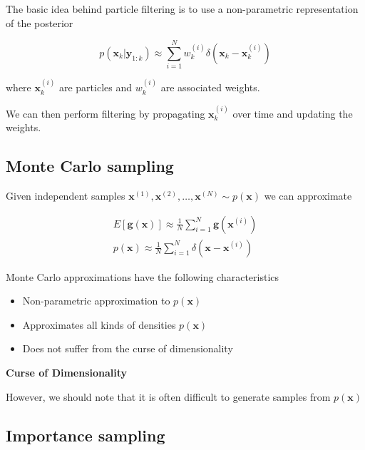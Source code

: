 The basic idea behind particle filtering is to use a non-parametric representation of the posterior

\begin{equation}
p(\mathbf{x}_k | \mathbf{y}_{1:k}) \approx \sum_{i=1}^N w_{k}^{(i)} \delta (\mathbf{x}_k -\mathbf{x}_{k}^{(i)})
\end{equation}

where $\mathbf{x}_{k}^{(i)}$ are particles and $w_{k}^{(i)}$ are associated weights.

We can then perform filtering by propagating $\mathbf{x}_{k}^{(i)}$ over time and
updating the weights.


\subsection{Monte Carlo sampling}
\label{monte_carlo_sampling}

Given independent samples $\mathbf{x}^{(1)}, \mathbf{x}^{(2)}, \ldots, \mathbf{x}^{(N)} \sim p(\mathbf{x})$ we can approximate

\begin{eqnarray}
E[\mathbf{g}(\mathbf{x})] \approx \frac{1}{N}\sum_{i=1}^N \mathbf{g}(\mathbf{x}^{(i)}) \\
p(\mathbf{x}) \approx \frac{1}{N}\sum_{i=1}^N \delta(\mathbf{x} - \mathbf{x}^{(i)})
\end{eqnarray}

Monte Carlo approximations have the following characteristics

\begin{itemize}
\item Non-parametric approximation to $p(\mathbf{x})$
\item Approximates all kinds of densities $p(\mathbf{x})$
\item Does not suffer from the curse of dimensionality
\end{itemize}

\begin{framed}
\theoremstyle{remark}
\begin{remark}{\textbf{Curse of Dimensionality}}

\end{remark}
\end{framed}

However, we should note that it is often difficult to generate samples from $p(\mathbf{x})$

\subsection{Importance sampling}
\label{importance_sampling}

